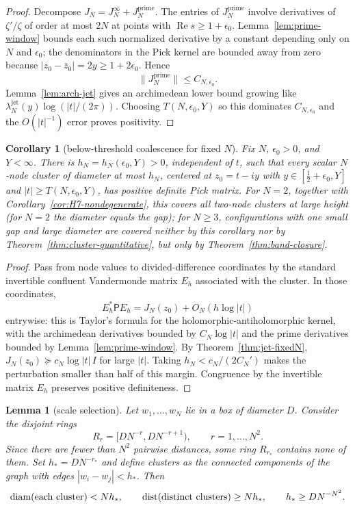 \documentclass[11pt]{amsart}
\newtheorem{lemma}[theorem]{Lemma}
\newtheorem{corollary}[theorem]{Corollary}
\theoremstyle{definition}
\theoremstyle{remark}
\theoremstyle{definition}
\renewcommand{\Re}{\operatorname{Re}}
\newcommand{\half}{\tfrac{1}{2}}
\begin{document}
\begin{proof}
Decompose $J_N=J_N^\infty+J_N^{\mathrm{prime}}$.  The entries of $J_N^{\mathrm{prime}}$ involve
derivatives of $\zeta'/\zeta$ of order at most $2N$ at points with
$\Re s\ge1+\epsilon_0$.  Lemma~\ref{lem:prime-window} bounds each such normalized derivative by a
constant depending only on $N$ and $\epsilon_0$; the denominators in the Pick kernel are bounded away
from zero because $|z_0-\bar z_0|=2y\ge1+2\epsilon_0$.  Hence
\[
   \|J_N^{\mathrm{prime}}\|\le C_{N,\epsilon_0}.
\]
Lemma~\ref{lem:arch-jet} gives an archimedean lower bound growing like
$\lambda_N^{\mathrm{jet}}(y)\log(|t|/(2\pi))$.  Choosing $T(N,\epsilon_0,Y)$ so this dominates
$C_{N,\epsilon_0}$ and the $O(|t|^{-1})$ error proves positivity.
\end{proof}

\begin{corollary}[below-threshold coalescence for fixed $N$]\label{cor:below-threshold}
Fix $N$, $\epsilon_0>0$, and $Y<\infty$.  There is
$h_N=h_N(\epsilon_0,Y)>0$, independent of $t$, such that every scalar $N$-node cluster of diameter at
most $h_N$, centered at $z_0=t-iy$ with $y\in[\half+\epsilon_0,Y]$ and
$|t|\ge T(N,\epsilon_0,Y)$, has positive definite Pick matrix.  For $N=2$, together with Corollary~\ref{cor:H7-nondegenerate}, this covers all two-node clusters at
large height (for $N=2$ the diameter equals the gap); for $N\ge3$, configurations with one small gap
and large diameter are covered neither by this corollary nor by Theorem~\ref{thm:cluster-quantitative}, but only by Theorem~\ref{thm:band-closure}.
\end{corollary}

\begin{proof}
Pass from node values to divided-difference coordinates by the standard invertible confluent
Vandermonde matrix $E_h$ associated with the cluster.  In those coordinates,
\[
   E_h^*\mathsf P E_h=J_N(z_0)+O_N(h\log|t|)
\]
entrywise: this is Taylor's formula for the holomorphic-antiholomorphic kernel, with the archimedean
derivatives bounded by $C_N\log|t|$ and the prime derivatives bounded by Lemma~\ref{lem:prime-window}.
By Theorem~\ref{thm:jet-fixedN}, $J_N(z_0)\succeq c_N\log|t|\,I$ for large $|t|$.  Taking
$h_N<c_N/(2C_N')$ makes the perturbation smaller than half of this margin.  Congruence by the
invertible matrix $E_h$ preserves positive definiteness.
\end{proof}

\begin{lemma}[scale selection]\label{lem:scale-selection}
Let $w_1,\ldots,w_N$ lie in a box of diameter $D$.  Consider the disjoint rings
\[
   R_r=[DN^{-r},DN^{-r+1}),\qquad r=1,\ldots,N^2.
\]
Since there are fewer than $N^2$ pairwise distances, some ring $R_{r_*}$ contains none of them.  Set
$h_*=DN^{-r_*}$ and define clusters as the connected components of the graph with edges
$|w_i-w_j|<h_*$.  Then
\[
   \operatorname{diam}(\textnormal{each cluster})<Nh_*,
   \qquad
   \operatorname{dist}(\textnormal{distinct clusters})\ge Nh_*,
   \qquad
   h_*\ge DN^{-N^2}.
\]
\end{lemma}
\end{document}
